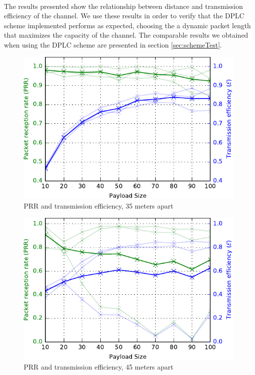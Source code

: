 \paragraph{} The results presented show the relationship between distance and transmission efficiency of the channel. We use these results in order to verify that the DPLC scheme implemented performs as expected, choosing the a dynamic packet length that maximizes the capacity of the channel. The comparable results we obtained when using the DPLC scheme are presented in section \ref{sec:schemeTest}.

\begin{figure}
\centering
\includegraphics[scale=1]{figs/35mTest.pdf} 
\caption{PRR and transmission efficiency, 35 meters apart\label{fig:35mTest}}
\end{figure}

\begin{figure}
\centering
\includegraphics[scale=1]{figs/45mTest.pdf} 
\caption{PRR and transmission efficiency, 45 meters apart\label{fig:45mTest}}
\end{figure}